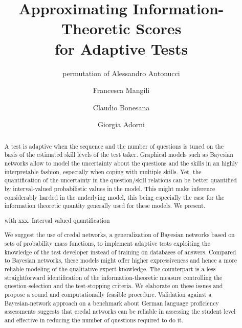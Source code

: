 \documentclass[runningheads]{llncs}
\begin{document}
\title{Approximating Information-Theoretic Scores\\for Adaptive Tests}
\author{permutation of Alessandro Antonucci \and
Francesca Mangili \and
Claudio Bonesana\and
Giorgia Adorni}
\maketitle          
\begin{abstract}
A test is adaptive when the sequence and the number of questions is tuned on the basis of the estimated skill levels of the test taker. Graphical models such as Bayesian networks allow to model the uncertainty about the questions and the skills in an highly interpretable fashion, especially when coping with multiple skills. Yet, the quantification of the uncertainty in the question/skill relations can be better quantified by interval-valued probabilistic values in the model. This might make inference considerably harded in the underlying model, this being especially the case for the information theoretic quantity generally used for these models. We present.

with xxx. Interval valued quantification


We suggest the use of credal networks, a generalization of Bayesian networks based on sets of probability mass functions, to implement adaptive tests exploiting the knowledge of the test developer instead of training on databases of answers. Compared to Bayesian networks, these models might offer higher expressiveness and hence a more reliable modeling of the qualitative expert knowledge. The counterpart is a less straightforward identification of the 
information-theoretic measure controlling the question-selection and the test-stopping criteria. We elaborate on these issues and propose a sound and computationally feasible procedure. Validation against a Bayesian-network approach 
on a benchmark about German language proficiency assessments suggests that credal networks can be reliable in assessing the student level and  effective in reducing the number of questions required to do it.
\end{abstract}
\end{document}
